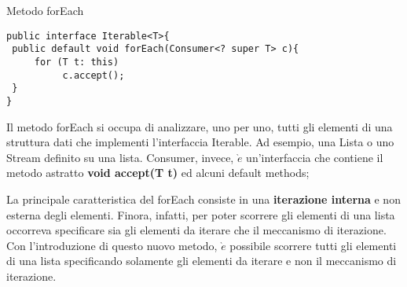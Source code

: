 \documentclass{beamer}
\begin{document}
\begin{frame}[fragile]{Metodo forEach}
\begin{block}{}
\begin{lstlisting}
public interface Iterable<T>{ 
 public default void forEach(Consumer<? super T> c){
     for (T t: this)
          c.accept();
 }
}
\end{lstlisting}
\end{block}
\begin{flushleft}
\end{flushleft}
\fontsize{10pt}{7.2}\selectfont
\begin{flushleft}
Il metodo forEach si occupa di analizzare, uno per uno, tutti gli elementi di una struttura dati che implementi l'interfaccia Iterable. Ad esempio, una Lista o uno Stream definito su una lista. Consumer, invece, $\grave{e}$ un'interfaccia che contiene il metodo astratto \textbf{void	accept(T t)} ed alcuni default methods;
\end{flushleft}
\begin{flushleft}
La principale caratteristica del forEach consiste in una \textbf{iterazione interna} e non esterna degli elementi. Finora, infatti, per poter scorrere gli elementi di una lista occorreva specificare sia gli elementi da iterare che il meccanismo di iterazione. Con l'introduzione di questo nuovo metodo, $\grave{e}$ possibile scorrere tutti gli elementi di una lista specificando solamente gli elementi da iterare e non il meccanismo di iterazione.
\end{flushleft}
\end{frame}
\end{document}
